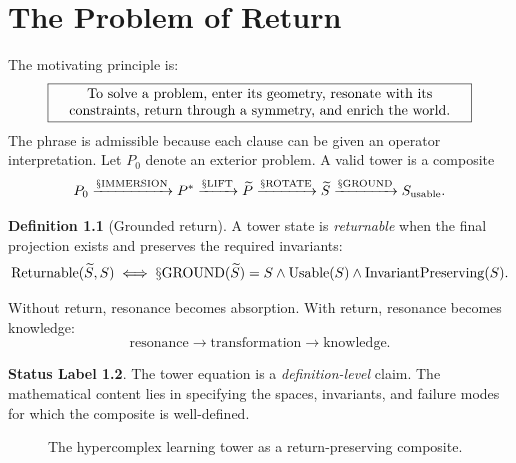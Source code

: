 \documentclass[11pt,oneside]{book}
\theoremstyle{definition}
\newtheorem{definition}{Definition}[chapter]
\newtheorem{status}[definition]{Status Label}
\theoremstyle{plain}
\theoremstyle{remark}
\newcommand{\Sop}[1]{\mathsection\mathrm{#1}}
\newcommand{\Ground}{\Sop{GROUND}}
\newcommand{\Lift}{\Sop{LIFT}}
\newcommand{\Immersion}{\Sop{IMMERSION}}
\newcommand{\Usable}{S_{\mathrm{usable}}}
\begin{document}
\tableofcontents

\mainmatter

\chapter{The Problem of Return}

The motivating principle is:
\[
\boxed{\parbox{0.86\textwidth}{\centering
To solve a problem, enter its geometry, resonate with its constraints,
return through a symmetry, and enrich the world.}}
\]
The phrase is admissible because each clause can be given an operator interpretation.
Let \(P_0\) denote an exterior problem.  A valid tower is a composite
\[
P_0
\xrightarrow{\Immersion}
P^\ast
\xrightarrow{\Lift}
\widetilde P
\xrightarrow{\Sop{ROTATE}}
\widetilde S
\xrightarrow{\Ground}
\Usable .
\]

\begin{definition}[Grounded return]
A tower state is \emph{returnable} when the final projection exists and preserves the
required invariants:
\[
\mathrm{Returnable}(\widetilde S,S)
\iff
\Ground(\widetilde S)=S
\land \mathrm{Usable}(S)
\land \mathrm{InvariantPreserving}(S).
\]
\end{definition}

Without return, resonance becomes absorption.  With return, resonance becomes knowledge:
\[
\mathrm{resonance}\rightarrow\mathrm{transformation}\rightarrow\mathrm{knowledge}.
\]

\begin{status}
The tower equation is a \emph{definition-level} claim.  The mathematical content lies in
specifying the spaces, invariants, and failure modes for which the composite is well-defined.
\end{status}

\begin{figure}[ht]
\centering
{}
\caption{The hypercomplex learning tower as a return-preserving composite.}
\end{figure}
\end{document}
